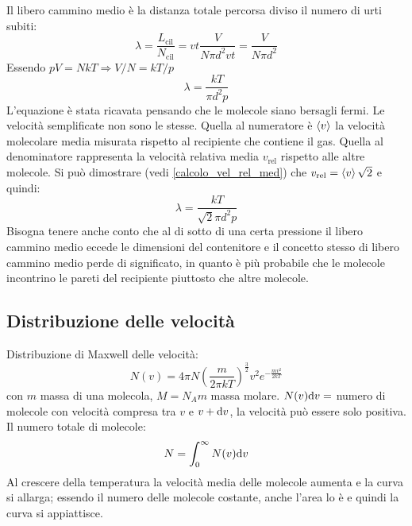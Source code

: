 Il libero cammino medio è la distanza totale percorsa diviso il numero di urti subiti:
\[\lambda=\frac{L_{\text{cil}}}{N_{\text{cil}}}=vt\frac{V}{N\pi d^2vt}=\frac{V}{N\pi d^2}\]
Essendo $pV=NkT \Rightarrow V/N=kT/p$
\[\lambda=\frac{kT}{\pi d^2 p}\]
L'equazione è stata ricavata pensando che le molecole siano bersagli fermi. Le velocità semplificate non sono le stesse. Quella al numeratore è $\left<v\right>$ la velocità molecolare media misurata rispetto al recipiente che contiene il gas. Quella al denominatore rappresenta la velocità relativa media $v_\text{rel}$ rispetto alle altre molecole. Si può dimostrare (vedi \ref{calcolo_vel_rel_med}) che $v_\text{rel}=\left<v\right>\sqrt{2}$ e quindi:
\[\lambda=\frac{kT}{\sqrt{2}\pi d^2p}\]
Bisogna tenere anche conto che al di sotto di una certa pressione il libero cammino medio eccede le dimensioni del contenitore e il concetto stesso di libero cammino  medio perde di significato, in quanto è più probabile che le molecole incontrino le pareti del recipiente piuttosto che altre molecole.

\subsection{Distribuzione delle velocità}
Distribuzione di Maxwell delle velocità:
\begin{equation}
   N(v)=4\pi N\left(\frac{m}{2\pi kT}\right)^{\frac{3}{2}}v^2e^{-\frac{mv^2}{2kT}}
\end{equation}
con $m$ massa di una molecola, $M=N_Am$ massa molare.
$N(v)\mathrm{d} v=$ numero di molecole con velocità compresa tra $v$ e $v+\mathrm{d} v$, la velocità può essere solo positiva. Il numero totale di molecole:
\begin{equation}
   N=\int_0^\infty N(v)\mathrm{d} v
\end{equation}
Al crescere della temperatura la velocità media delle molecole aumenta e la curva si allarga; essendo il numero delle molecole costante, anche l'area lo è e quindi la curva si appiattisce.


